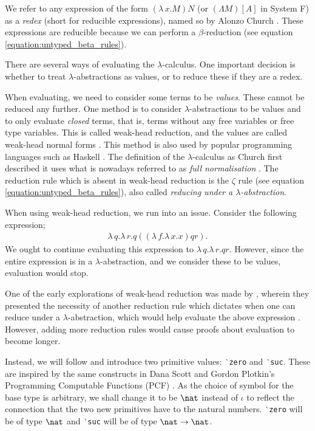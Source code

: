 We refer to any expression of the form $(\lambda \, x. M) N$ (or $(\Lambda M) [A]$ in System F) as a
\textit{redex} (short for reducible expressions), named so by Alonzo Church
\citep[p.~56]{pierce_types_2002}. These expressions are reducible because we can perform a
$\beta$-reduction (see equation \ref{equation:untyped_beta_rules}).

There are several ways of evaluating the $\lambda$-calculus. One important decision is whether to
treat $\lambda$-abstractions as values, or to reduce these if they are a redex.

When evaluating, we need to consider some terms to be \textit{values}. These cannot be reduced any
further. One method is to consider $\lambda$-abstractions to be values and to only evaluate
\textit{closed} terms, that is, terms without any free variables or free type variables. This is
called weak-head reduction, and the values are called weak-head normal forms
\citep{wadler_programming_2022}. This method is also used by popular programming languages such as
Haskell \citep{hutchison_sharing_2005}. The definition of the $\lambda$-calculus as Church first
described it uses what is nowadays referred to as \textit{full normalisation}
\citep{wadler_programming_2022}. The reduction rule which is absent in weak-head reduction is the
$\zeta$ rule (see equation \ref{equation:untyped_beta_rules}), also called \textit{reducing under a
$\lambda$-abstraction}.

When using weak-head reduction, we run into an issue. Consider the following expression;
\begin{align*}
  \lambda \, q. \lambda \, r. q ((\lambda \, f. \lambda \, x . x) q r).
\end{align*}
We ought to continue evaluating this expression to $\lambda \, q. \lambda \, r. q r$. However, since
the entire expression is in a $\lambda$-abstraction, and we consider these to be values, evaluation
would stop.

One of the early explorations of weak-head reduction was made by \citet{cagman_combinatory_1998},
wherein they presented the necessity of another reduction rule which dictates when one can reduce
under a $\lambda$-abstraction, which would help evaluate the above expression
\citep{hutchison_sharing_2005}. However, adding more reduction rules would cause proofs about
evaluation to become longer.

Instead, we will follow \citet{wadler_programming_2022} and introduce two primitive values:
\texttt{‵zero} and \texttt{‵suc}. These are inspired by the same constructs in Dana Scott and Gordon
Plotkin's Programming Computable Functions (PCF) \citep{plotkin_lcf_1977}. As the choice of symbol
for the base type is arbitrary, we shall change it to be $\nat$ instead of $\iota$ to reflect the
connection that the two new primitives have to the natural numbers. \texttt{‵zero} will be of type
$\nat$ and \texttt{‵suc} will be of type $\nat \to \nat$.

